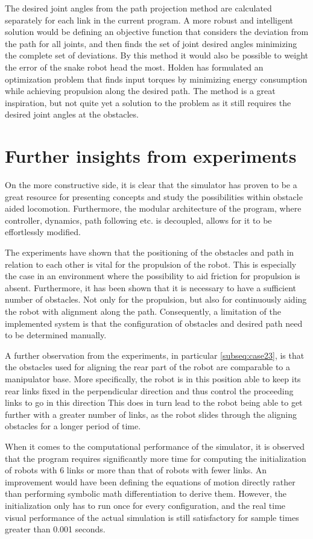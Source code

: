 The desired joint angles from the path projection method are calculated separately for each link in the current program. A more robust and intelligent solution would be defining an objective function that considers the deviation from the path for all joints, and then finds the set of joint desired angles minimizing the complete set of deviations. By this method it would also be possible to weight the error of the snake robot head the most. Holden \cite{holden2014optimal} has formulated an optimization problem that finds input torques by minimizing energy consumption while achieving propulsion along the desired path. The method is a great inspiration, but not quite yet a solution to the problem as it still requires the desired joint angles at the obstacles.

\section{Further insights from experiments}

On the more constructive side, it is clear that the simulator has proven to be a great resource for presenting concepts and study the possibilities within obstacle aided locomotion. Furthermore, the modular architecture of the program, where controller, dynamics, path following etc. is decoupled, allows for it to be effortlessly modified.

The experiments have shown that the positioning of the obstacles and path in relation to each other is vital for the propulsion of the robot. This is especially the case in an environment where the possibility to aid friction for propulsion is absent. Furthermore, it has been shown that it is necessary to have a sufficient number of obstacles. Not only for the propulsion, but also for continuously aiding the robot with alignment along the path. Consequently, a limitation of the implemented system is that the configuration of obstacles and desired path need to be determined manually.

A further observation from the experiments, in particular \ref{subseq:case23}, is that the obstacles used for aligning the rear part of the robot are comparable to a manipulator base. More specifically, the robot is in this position able to keep its rear links fixed in the perpendicular direction and thus control the proceeding links to go in this direction
This does in turn lead to the robot being able to get further with a greater number of links, as the robot slides through the aligning obstacles for a longer period of time.

When it comes to the computational performance of the simulator, it is observed that the program requires significantly more time for computing the initialization of robots with 6 links or more than that of robots with fewer links. An improvement would have been defining the equations of motion directly rather than performing symbolic math differentiation to derive them. However, the initialization only has to run once for every configuration, and the real time visual performance of the actual simulation is still satisfactory for sample times greater than 0.001 seconds.



